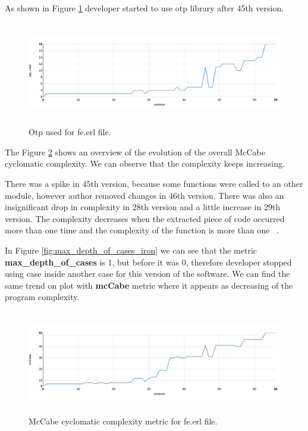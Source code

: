 As shown in Figure \ref{fig:otp_iron} developer started to use otp library after 45th version. 

\begin{figure}[h]
	\centering
	\includegraphics[height=45mm]{figures/otp_iron.png}
	\caption{Otp used for fe.erl file.}
	\label{fig:otp_iron}
\end{figure}

The Figure \ref{fig:mcCabe_iron} shows an overview of the evolution of the overall McCabe cyclomatic complexity. We can observe that the complexity keeps increasing.

There was a spike in 45th version, because some functions were called to an other module, however author removed changes in 46th version. There was also an insignificant drop in complexity in 28th version and a little increase in 29th version. The  complexity decreases  when  the  extracted  piece  of code occurred more than one time and the complexity of the function is more than one ~\cite{mcCabe}. 

In Figure \ref{fig:max_depth_of_cases_iron} we can see that the metric \textbf{max\_depth\_of\_cases} is 1, but before it was 0, therefore developer stopped using case inside another case for this version of the software. We can find the same trend on plot with \textbf{mcCabe} metric where it appears as decreasing of the program complexity.  

\begin{figure}[h]
	\centering
	\includegraphics[height=45mm]{figures/mcCabe_iron.png}
	\caption{McCabe cyclomatic complexity metric for fe.erl file.}
	\label{fig:mcCabe_iron}
\end{figure}

